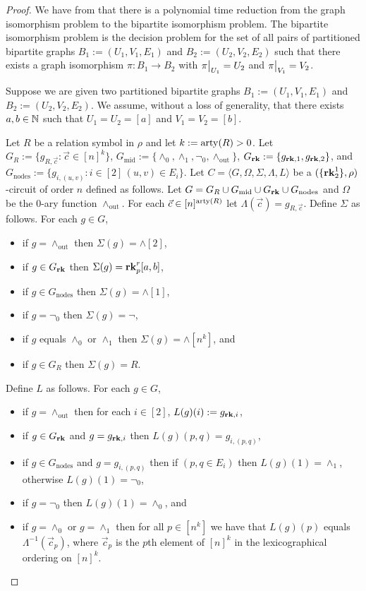 \documentclass[../paper.tex]{subfiles}
\begin{document}
\begin{proof}
  We have from \cite{} that there is a polynomial time reduction from the graph
  isomorphism problem to the bipartite isomorphism problem. The bipartite
  isomorphism problem is the decision problem for the set of all pairs of
  partitioned bipartite graphs $B_1 := (U_1, V_1, E_1)$ and $B_2 := (U_2, V_2,
  E_2)$ such that there exists a graph isomorphism $\pi : B_1 \rightarrow B_2$
  with $\restr{\pi}{U_1} = U_2$ and $\restr{\pi}{V_1} = V_2$.

  Suppose we are given two partitioned bipartite graphs $B_1 := (U_1, V_1, E_1)$
  and $B_2 := (U_2, V_2, E_2)$. We assume, without a loss of generality, that
  there exists $a, b \in \mathbb{N}$ such that $U_1 = U_2 = [a]$ and $V_1 = V_2 =
  [b]$.

  Let $R$ be a relation symbol in $\rho$ and let $k := \mathrm{arty}(R) > 0$. Let $G_{R}
  := \{g_{R, \vec{c}} : \vec{c} \in [n]^k\}$, $G_{\text{mid}} := \{\land_0,
  \land_1, \neg_0, \land_{\text{out}} \}$, $G_{\text{\textbf{rk}}} : = \{ g_{\text{\textbf{rk}}, 1},
  g_{\text{\textbf{rk}}, 2}\}$, and $G_{\text{nodes}} := \{g_{i, (u,v)} : i \in [2] \, (u,v)
  \in E_i \}$. Let $C = \langle G, \Omega, \Sigma, \Lambda, L \rangle$ be a
  $(\{\text{\textbf{rk}}^{1}_2\}, \rho)$-circuit of order $n$ defined as follows. Let $G =
  G_R \cup G_{\text{mid}} \cup G_{\text{\textbf{rk}}} \cup G_{\text{nodes}}$ and $\Omega$ be
  the $0$-ary function $\land_{\text{out}}$. For each $\vec{c} \in
  [n]^{\mathrm{arty}(R)}$ let $\Lambda(\vec{c}) = g_{R, \vec{c}}$. Define $\Sigma$ as
  follows. For each $g \in G$,
  \begin{itemize}
    \setlength\itemsep{0mm}
  \item if $g = \land_{\text{out}}$ then $\Sigma(g) = \land[2]$,
  \item if $g \in G_{\text{\textbf{rk}}}$ then $\Sigma(g) = \text{\textbf{rk}}^r_p [a,b]$,
  \item if $g \in G_{\text{nodes}}$ then $\Sigma(g) = \land[1]$,
  \item if $g= \neg_0$ then $\Sigma(g) = \neg$,
  \item if $g$ equals $\land_0$ or $\land_1$ then $\Sigma(g) = \land[n^k]$, and
  \item if $g \in G_R$ then $\Sigma(g) = R$.
  \end{itemize}
  Define $L$ as follows. For each $g \in G$,
  \begin{itemize}
    \setlength\itemsep{0mm}
  \item if $g = \land_{\text{out}}$ then for each $i \in [2]$, $L(g)(i) :=
    g_{\text{\textbf{rk}}, i}$,
  \item if $g \in G_{\text{\textbf{rk}}}$ and $g = g_{\text{\textbf{rk}}, i}$ then $L(g)(p,q) = g_{i,
      (p,q)}$,
  \item if $g \in G_{\text{nodes}}$ and $g = g_{i, (p,q)}$ then if $(p, q \in
    E_i)$ then $L(g)(1) = \land_1$, otherwise $L(g)(1) = \neg_0$,
  \item if $g = \neg_0$ then $L(g)(1) = \land_0$, and
  \item if $g = \land_0$ or $g = \land_1$ then for all $p \in [n^k]$ we have
    that $L(g)(p)$ equals $\Lambda^{-1}(\vec{c}_p)$, where $\vec{c}_p$ is the
    $p$th element of $[n]^k$ in the lexicographical ordering on $[n]^k$.
  \end{itemize}


\end{proof}
\end{document}
